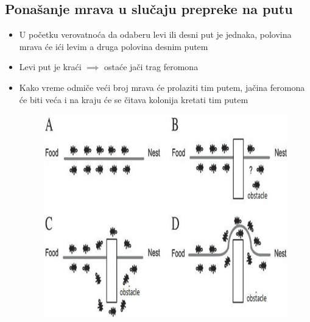 \documentclass[11pt]{beamer}
\begin{document}
\subsection{Ponašanje mrava u slučaju prepreke na putu}
\begin{frame}{}
      \begin{itemize}
      \item U početku verovatnoća da odaberu levi ili desni put je jednaka, polovina mrava će ići levim a druga polovina desnim putem
      \item Levi put je kraći $\implies$ ostaće jači trag feromona
      \item Kako vreme odmiče veći broj mrava će prolaziti tim putem, jačina feromona će biti veća i na kraju će se čitava kolonija kretati tim putem
        \begin{figure}
          \begin{flushright}
            \includegraphics[scale=0.3]{../documentation/aco_obstacle.png}
          \end{flushright}
        \end{figure}
      \end{itemize}
\end{frame}





\end{document}
